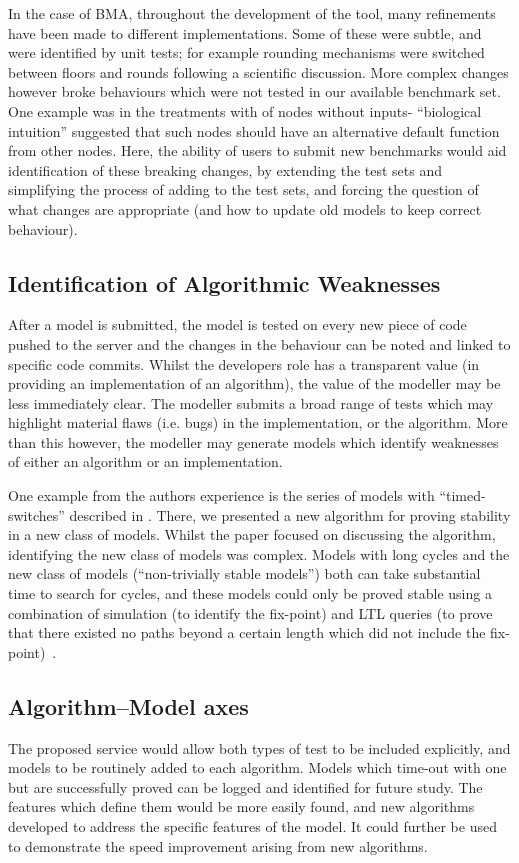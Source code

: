 \documentclass{llncs}
\begin{document}
In the case of BMA, throughout the development of the tool, many
refinements have been made to different implementations. Some of these
were subtle, and were identified by unit tests; for example rounding
mechanisms were switched between floors and rounds following a
scientific discussion. More complex changes however broke behaviours
which were not tested in our available benchmark set. One example was
in the treatments with of nodes without inputs- ``biological
intuition'' suggested that such nodes should have an alternative
default function from other nodes. Here, the ability of users to
submit new benchmarks would aid identification of these breaking
changes, by extending the test sets and simplifying the process of
adding to the test sets, and forcing the question of what changes are
appropriate (and how to update old models to keep correct behaviour).


\subsection{Identification of Algorithmic Weaknesses}

After a model is
submitted, the model is tested on every new piece of code pushed to
the server and the changes in the behaviour can be noted and linked to
specific code commits. Whilst the developers role has a transparent
value (in providing an implementation of an algorithm), the value of
the modeller may be less immediately clear. The modeller submits a
broad range of tests which may highlight material flaws (i.e. bugs) in
the implementation, or the algorithm. More than this however, the
modeller may generate models which identify weaknesses of either an
algorithm or an implementation. 

One example from the authors experience is the series of models with
``timed-switches'' described in \cite{cook2014}. There, we presented a
new algorithm for proving stability in a new class of models. Whilst
the paper focused on discussing the algorithm, identifying the new
class of models was complex. Models with long cycles and the new class
of models (``non-trivially stable models'') both can take substantial
time to search for cycles, and these models could only be proved
stable using a combination of simulation (to identify the fix-point)
and LTL queries (to prove that there existed no paths beyond a certain
length which did not include the fix-point)~\cite{piterman2013}.

\subsection{Algorithm--Model axes}
The proposed service would allow both types of test to be included explicitly,
and models to be routinely added to each algorithm. Models which time-out with 
one but are successfully proved can be logged and identified for future study.
The features which define them would be more easily found, and new algorithms
developed to address the specific features of the model. It could further be 
used to demonstrate the speed improvement arising from new algorithms.
\end{document}
